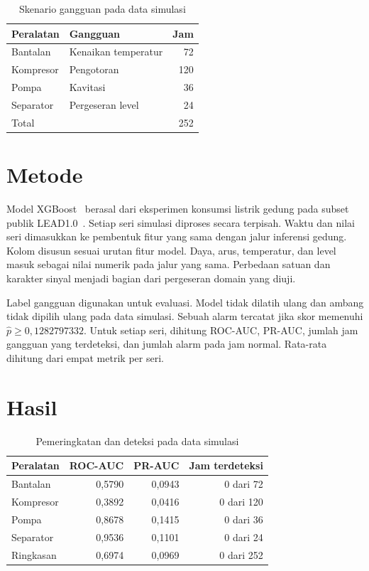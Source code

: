 \documentclass[conference]{IEEEtran}
\begin{document}
\begin{table}[t]
\centering
\caption{Skenario gangguan pada data simulasi}
\label{tab:skenario}
\small
\begin{tabular}{llr}
\toprule
Peralatan & Gangguan & Jam \\
\midrule
Bantalan & Kenaikan temperatur & 72 \\
Kompresor & Pengotoran & 120 \\
Pompa & Kavitasi & 36 \\
Separator & Pergeseran level & 24 \\
\midrule
Total & & 252 \\
\bottomrule
\end{tabular}
\end{table}

\section{Metode}
Model XGBoost~\cite{xgb} berasal dari eksperimen konsumsi listrik gedung pada subset publik LEAD1.0~\cite{lead}. Setiap seri simulasi diproses secara terpisah. Waktu dan nilai seri dimasukkan ke pembentuk fitur yang sama dengan jalur inferensi gedung. Kolom disusun sesuai urutan fitur model. Daya, arus, temperatur, dan level masuk sebagai nilai numerik pada jalur yang sama. Perbedaan satuan dan karakter sinyal menjadi bagian dari pergeseran domain yang diuji.

Label gangguan digunakan untuk evaluasi. Model tidak dilatih ulang dan ambang tidak dipilih ulang pada data simulasi. Sebuah alarm tercatat jika skor memenuhi $\hat{p}\geq 0{,}1282797332$. Untuk setiap seri, dihitung ROC-AUC, PR-AUC, jumlah jam gangguan yang terdeteksi, dan jumlah alarm pada jam normal. Rata-rata dihitung dari empat metrik per seri.

\section{Hasil}
\begin{table}[t]
\centering
\caption{Pemeringkatan dan deteksi pada data simulasi}
\label{tab:hasil}
\small
\setlength{\tabcolsep}{4pt}
\begin{tabular}{lrrr}
\toprule
Peralatan & ROC-AUC & PR-AUC & Jam terdeteksi \\
\midrule
Bantalan & 0,5790 & 0,0943 & 0 dari 72 \\
Kompresor & 0,3892 & 0,0416 & 0 dari 120 \\
Pompa & 0,8678 & 0,1415 & 0 dari 36 \\
Separator & 0,9536 & 0,1101 & 0 dari 24 \\
\midrule
Ringkasan & 0,6974 & 0,0969 & 0 dari 252 \\
\bottomrule
\end{tabular}
\end{table}
\end{document}
